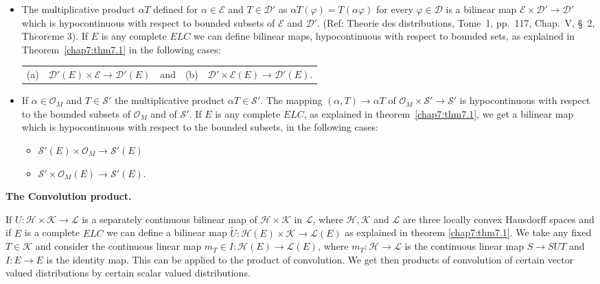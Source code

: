 \eject
{}
\begin{itemize}
\item [1)] The multiplicative product $\alpha T$ defined for $\alpha
  \in \mathscr{E}$ and $T \in \mathscr{D}'$ as $\alpha T (\varphi) =
  T(\alpha \varphi)$ for every $\varphi \in \mathscr{D}$ is a bilinear
  map $\mathscr{E} \times \mathscr{D}' \to \mathscr{D}'$ which is
  hypocontinuous with respect to bounded subsets of $\mathscr{E}$ and
  $\mathscr{D}'$. (Ref: Theorie des distributions, Tome~1, pp.~117,
  Chap.~V, \S~2, Th$\acute{e}$or$\grave{e}$me 3). If $E$ is any
  complete $E L C$ we can define bilinear maps, hypocontinuous with
  respect to bounded sets, as explained in Theorem~\ref{chap7:thm7.1} in the
  following cases:
\begin{center}
{\tabcolsep=4pt
\begin{tabular}{rlcrl}
(a) & $\mathscr{D}'(E)\times \mathscr{E}\to\mathscr{D}'(E)$ & and &
  (b) & $\mathscr{D}' \times \mathscr{E} (E) \to \mathscr{D}' (E)$.
\end{tabular}}
\end{center}
\item [2)] If $\alpha \in \mathscr{O}_M$ and $T \in \mathscr{S}'$ the
  multiplicative product $\alpha T \in \mathscr{S}'$. The mapping
  $(\alpha, T) \to \alpha T$ of $\mathscr{O}_M \times \mathscr{S}' \to
  \mathscr{S}'$ is hypocontinuous with respect to the bounded subsets
  of $\mathscr{O}_M$ and of $\mathscr{S}'$. If $E$ is any complete $E
  L C$, as explained in theorem~\ref{chap7:thm7.1}, we get a bilinear map
  which is hypocontinuous with respect to the bounded subsets, in the 
  following cases:
\begin{itemize}
\item [(a)] $\mathscr{S}' (E) \times \mathscr{O}_M \to \mathscr{S}'
  (E)$
\item [(b)] $\mathscr{S}' \times \mathscr{O}_M (E) \to \mathscr{S}'(E)$.
\end{itemize}
\end{itemize}

\noindent
{\bf The Convolution product.}
\medskip

If $U : \mathscr{H} \times \mathscr{K} \to \mathscr{L}$ is a
separately continuous bilinear map of $\mathscr{H} \times \mathscr{K}$
in $\mathscr{L}$, where $\mathscr{H}, \mathscr{K}$ and $\mathscr{L}$
are three locally convex Hausdorff spaces and if $E$ is a complete $E
L C$ we can define a bilinear map $\tilde{U} : \mathscr{H}(E)\times
\mathscr{K}\to\mathscr{L}(E)$ as explained in theorem \ref{chap7:thm7.1}.
We take any fixed $T\in\mathscr{K}$ and consider the continuous linear map
$m_T \in I :\mathscr{H}(E) \to \mathscr{L}(E)$, where $m_T :
\mathscr{H}\to\mathscr{L}$ is the continuous linear map $S \to S U
T$ and $I : E \to E$ is the identity map. This can be applied to the
product of convolution. We get then products of convolution of certain
vector valued distributions by certain scalar valued distributions. 


